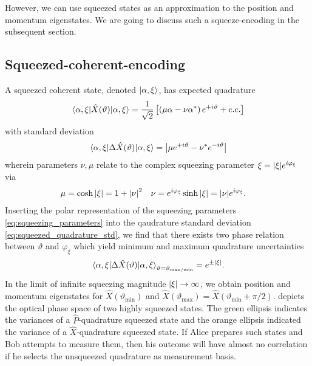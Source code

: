 However, we can use squeezed states as an approximation to the position and momentum eigenstates.
We are going to discuss such a squeeze-encoding in the subsequent section.

\FloatBarrier
\subsection{Squeezed-coherent-encoding}

A squeezed coherent state, denoted $\ket{\alpha,\xi}$, has expected quadrature~\cite[p.~91,94]{Vogel2006}
\begin{equation}
	\expval{\hat{X}(\vartheta)}{\alpha,\xi}
	=
	\frac{1}{\sqrt{2}}
	\left[
		\left(\mu\alpha-\nu\alpha^*\right)
		e^{+i\vartheta}
		+
		\text{c.c.}
	\right]
\end{equation}
with standard deviation~\cite[p.~95]{Vogel2006}
\begin{equation}
	\expval{\Delta\hat{X}(\vartheta)}{\alpha,\xi}
	=
	\abs{\mu e^{+i\vartheta}-\nu^* e^{-i\vartheta}}
	\label{eq:squeezed_quadrature_std}
\end{equation}
wherein parameters $\nu,\mu$ relate to the complex squeezing parameter $\xi=\abs{\xi}e^{i\varphi_\xi}$ via~\cite[p.~90]{Vogel2006}
\begin{align}
	\mu
	&=
	\cosh\abs{\xi}
	=
	1+\abs{\nu}^2
	&
	\nu
	&=
	e^{i\varphi_\xi}
	\sinh\abs{\xi}
	=
	\abs{\nu}
	e^{i\varphi_\xi}
	\label{eq:squeezing_parameters}
	.
\end{align}
Inserting the polar representation of the squeezing parameters \cref{eq:squeezing_parameters} into the qaudrature standard deviation \cref{eq:squeezed_quadrature_std}, we find that there exists two phase relation between $\vartheta$ and $\varphi_\xi$ which yield minimum and maximum quadrature uncertainties~\cite[p.~96]{Vogel2006}
\begin{equation}
	\expval{\Delta\hat{X}(\vartheta)}{\alpha,\xi}_{\vartheta=\vartheta_{\text{max}/\text{min}}}
	=
	e^{\pm\abs{\xi}}
	.
\end{equation}
In the limit of infinite squeezing magnitude $\abs{\xi}\to\infty$, we obtain position and momentum eigenstates for $\hat{X}(\vartheta_\text{min})$ and $\hat{X}(\vartheta_\text{max})=\hat{X}(\vartheta_\text{min}+\pi/2)$.
 depicts the optical phase space of two highly squeezed states.
The green ellipsis indicates the variances of a $\hat{P}$-quadrature squeezed state and the orange ellipsis indicated the variance of a $\hat{X}$-quadrature squeezed state.
If Alice prepares such states and Bob attempts to measure them, then his outcome will have almost no correlation if he selects the unsqueezed quadrature as measurement basis.
